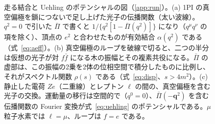 \documentclass[a4paper,10pt]{ltjsarticle}
\begin{document}
\begin{figure}[tbp]
\caption{走る結合と Uehling のポテンシャルの図（\ref{app:run}）。(a) 1PI の真空偏極を鎖につないで足し上げた光子の伝播関数（太い波線）。$q^2=0$ で引いた $\bar\Pi$ で書くと $1/\{q^2[1-\bar\Pi(q^2)]\}$ になり（$q^\mu q^\nu$ の項を除く）、頂点の $e^2$ と合わせたものが有効結合 $\alpha(q^2)$ である（式~\eqref{eq:aeff}）。(b) 真空偏極のループを破線で切ると、二つの半分は仮想の光子が対 $f\bar f$ になる木の振幅とその複素共役になる。$\bar\Pi$ の虚部は、この振幅の2乗を2体の位相空間で積分したものに比例し、それがスペクトル関数 $\rho(s)$ である（式~\eqref{eq:disp}、$s>4m^2$）。(c) 静止した電荷 $Ze$（二重線）とレプトン $\ell$ の間の、真空偏極を含む光子の交換。運動量の移行は空間的で（$q^0=0$）、$\bar\Pi(-\boldsymbol q^2)$ を含む伝播関数の Fourier 変換が式~\eqref{eq:uehling} のポテンシャルである。$\mu$ 粒子水素では $\ell=\mu$、ループは $f=e$ である。}
\label{fig:rundiag}
\end{figure}
\end{document}
